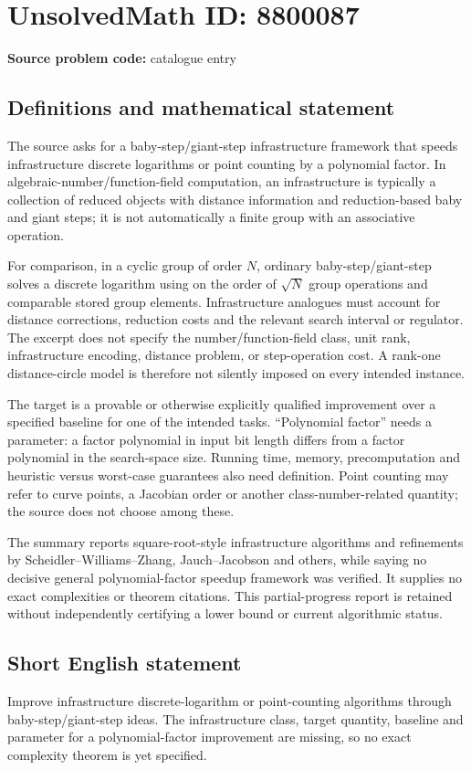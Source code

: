 \documentclass[11pt]{article}
\begin{document}
\section*{UnsolvedMath ID: 8800087}
\textbf{Source problem code:} catalogue entry
\subsection{Definitions and mathematical statement}
The source asks for a baby-step/giant-step infrastructure framework that speeds infrastructure discrete logarithms or point counting by a polynomial factor. In algebraic-number/function-field computation, an infrastructure is typically a collection of reduced objects with distance information and reduction-based baby and giant steps; it is not automatically a finite group with an associative operation.

For comparison, in a cyclic group of order \(N\), ordinary baby-step/giant-step solves a discrete logarithm using on the order of \(\sqrt N\) group operations and comparable stored group elements. Infrastructure analogues must account for distance corrections, reduction costs and the relevant search interval or regulator. The excerpt does not specify the number/function-field class, unit rank, infrastructure encoding, distance problem, or step-operation cost. A rank-one distance-circle model is therefore not silently imposed on every intended instance.

The target is a provable or otherwise explicitly qualified improvement over a specified baseline for one of the intended tasks. ``Polynomial factor'' needs a parameter: a factor polynomial in input bit length differs from a factor polynomial in the search-space size. Running time, memory, precomputation and heuristic versus worst-case guarantees also need definition. Point counting may refer to curve points, a Jacobian order or another class-number-related quantity; the source does not choose among these.

The summary reports square-root-style infrastructure algorithms and refinements by Scheidler--Williams--Zhang, Jauch--Jacobson and others, while saying no decisive general polynomial-factor speedup framework was verified. It supplies no exact complexities or theorem citations. This partial-progress report is retained without independently certifying a lower bound or current algorithmic status.
\subsection{Short English statement}
Improve infrastructure discrete-logarithm or point-counting algorithms through baby-step/giant-step ideas. The infrastructure class, target quantity, baseline and parameter for a polynomial-factor improvement are missing, so no exact complexity theorem is yet specified.
\end{document}
